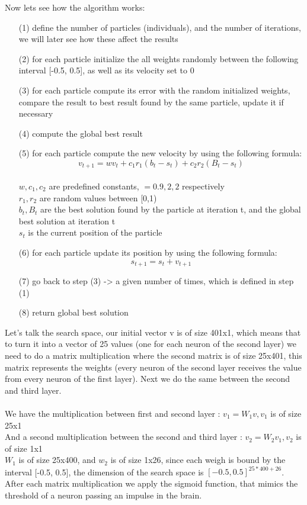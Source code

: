 \documentclass[a4paper]{article}
\begin{document}
Now lets see how the algorithm works:
\begin{itemize}
\item[(1)] define the number of particles (individuals), and the number of iterations, we will later see how these affect the results
\item[(2)] for each particle initialize the all weights randomly between the following interval [-0.5, 0.5], as well as its velocity set to 0
\item[(3)] for each particle compute its error with the random initialized weights, compare the result to best result found by the same particle, update it if necessary
\item[(4)] compute the global best result
\item[(5)] for each particle compute the new velocity by using the following formula:\\
$$v_{t+1} = w v_{t} + c_1 r_1(b_t - s_t) + c_2 r_2(B_t - s_t)$$\\
$w, c_1, c_2$ are predefined constants, $= 0.9, 2, 2$ respectively\\
$r_1, r_2$ are random values between [0,1)\\
$b_t, B_t$ are the best solution found by the particle at iteration t, and the global best solution at iteration t\\
$s_t$ is the current position of the particle
\item[(6)] for each particle update its position by using the following formula:\\
$$s_{t+1} = s_t + v_{t+1}$$
\item[(7)] go back to step (3) -> a given number of times, which is defined in step (1)
\item[(8)] return global best solution
\end{itemize}

Let's talk the search space, our initial vector v is of size 401x1, which means that to turn it into a vector of 25 values (one for each neuron of the second layer) we need to do a matrix multiplication where the second matrix is of size 25x401, this matrix represents the weights (every neuron of the second layer receives the value from every neuron of the first layer). Next we do the same between the second and third layer.\\\\
We have the multiplication between first and second layer : $v_1 = W_1 v, v_1$ is of size 25x1\\
And a second multiplication between the second and third layer : $v_2 = W_2 v_1, v_2 $ is of size 1x1\\
$W_1$ is of size 25x400, and $w_2$ is of size 1x26, since each weigh is bound by the interval [-0.5, 0.5], the dimension of the search space is $[-0.5,0.5]^{25*400+26}$.\\
After each matrix multiplication we apply the sigmoid function, that mimics the threshold of a neuron passing an impulse in the brain.
\newpage
\end{document}

